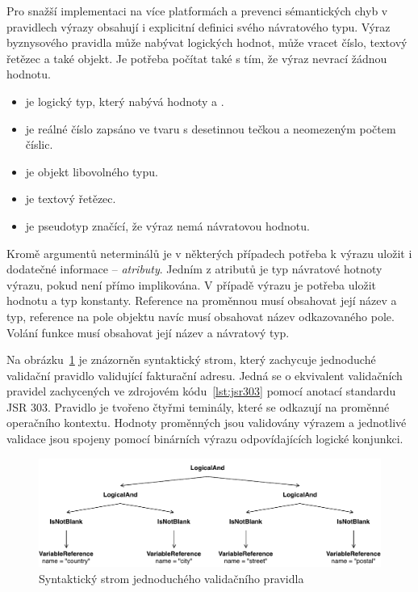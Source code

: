 Pro snažší implementaci na více platformách a prevenci sémantických chyb v pravidlech výrazy
obsahují i explicitní definici svého návratového typu. Výraz byznysového pravidla může nabývat logických hodnot,
může vracet číslo, textový řetězec a také objekt. Je potřeba počítat také s tím, že výraz nevrací žádnou
hodnotu.

\begin{itemize}
    \item {} je logický typ, který nabývá hodnoty  a .
    \item {} je reálné číslo zapsáno ve tvaru s desetinnou tečkou a neomezeným počtem číslic.
    \item {} je objekt libovolného typu.
    \item {} je textový řetězec.
    \item {} je pseudotyp značící, že výraz nemá návratovou hodnotu.
\end{itemize}

Kromě argumentů neterminálů je v některých případech potřeba k výrazu uložit i dodatečné informace --
\textit{atributy}. Jedním z atributů je typ návratové hotnoty výrazu, pokud není přímo implikována.
V případě výrazu  je potřeba uložit hodnotu a typ konstanty. Reference na proměnnou
musí obsahovat její název a typ, reference na pole objektu navíc musí obsahovat název odkazovaného pole.
Volání funkce musí obsahovat její název a návratový typ.

Na obrázku~\ref{fig:simple-rule} je znázorněn syntaktický strom, který zachycuje jednoduché
validační pravidlo validující fakturační adresu. Jedná se o ekvivalent validačních pravidel
zachycených ve zdrojovém kódu~\ref{lst:jsr303} pomocí anotací standardu \gls{JSR} 303.
Pravidlo je tvořeno čtyřmi teminály, které se odkazují na proměnné operačního kontextu.
Hodnoty proměnných jsou validovány výrazem  a jednotlivé validace
jsou spojeny pomocí binárních výrazu  odpovídajících logické konjunkci.

\begin{figure}
    \centering
    \includegraphics[keepaspectratio=true, width=1\linewidth]{figures/simple-rule.pdf}
    \caption{Syntaktický strom jednoduchého validačního pravidla}
    \label{fig:simple-rule}
\end{figure}

